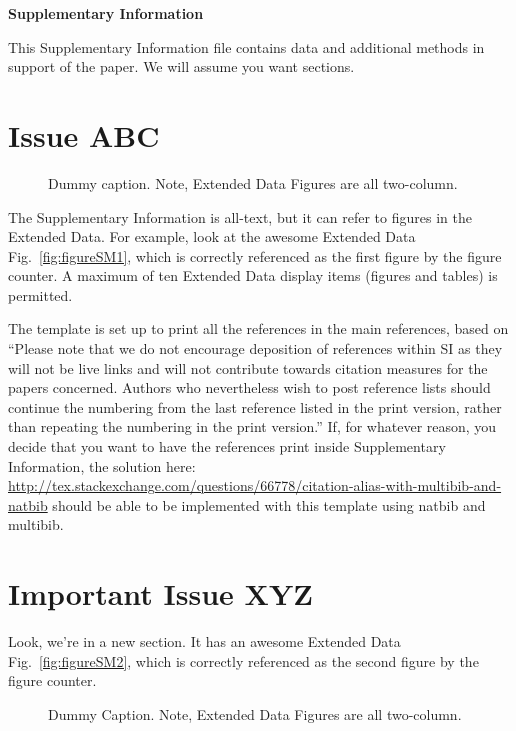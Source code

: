 \newpage
\textbf{\LARGE Supplementary Information}



This Supplementary Information file contains data and additional methods in support of the paper. We will assume you want sections.

\section{Issue ABC}
\label{sec:ABC}

\begin{figure}[t]
\centerline{}
\caption{ Dummy caption. Note, Extended Data Figures are all two-column.}
\end{figure}

The Supplementary Information is all-text, but it can refer to figures in the Extended Data. For example, look at the awesome Extended Data Fig.~\ref{fig:figureSM1}, which is correctly referenced as the first figure by the figure counter. A maximum of ten Extended Data display items (figures and tables) is permitted.

The template is set up to print all the references in the main references, based on\cite{nsuppmat} ``Please note that we do not encourage deposition of references within SI as they will not be live links and will not contribute towards citation measures for the papers concerned. Authors who nevertheless wish to post reference lists should continue the numbering from the last reference listed in the print version, rather than repeating the numbering in the print version.'' If, for whatever reason, you decide that you want to have the references print inside Supplementary Information, the solution here: \url{http://tex.stackexchange.com/questions/66778/citation-alias-with-multibib-and-natbib} should be able to be implemented with this template using natbib and multibib.



\section{Important Issue XYZ}
\label{sec:XYZ}

Look, we're in a new section. It has an awesome Extended Data Fig.~\ref{fig:figureSM2}, which is correctly referenced as the second figure by the figure counter.

\begin{figure}[t]
\centerline{}
\caption{ Dummy Caption. Note, Extended Data Figures are all two-column.}
\end{figure}






